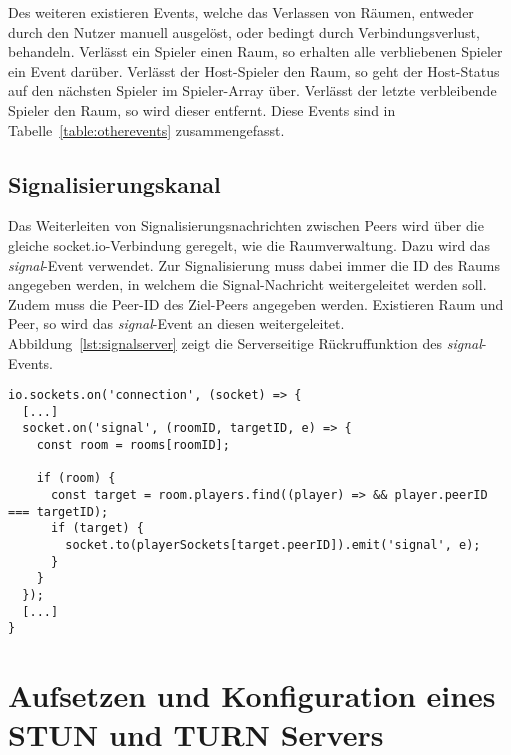 Des weiteren existieren Events, welche das Verlassen von Räumen, entweder durch den Nutzer manuell ausgelöst, oder bedingt durch Verbindungsverlust, behandeln. Verlässt ein Spieler einen Raum, so erhalten alle verbliebenen Spieler ein Event darüber. Verlässt der Host-Spieler den Raum, so geht der Host-Status auf den nächsten Spieler im Spieler-Array über. Verlässt der letzte verbleibende Spieler den Raum, so wird dieser entfernt. Diese Events sind in Tabelle~\ref{table:otherevents} zusammengefasst.\par

\subsection{Signalisierungskanal}
\label{section:signalisierungskanal}
Das Weiterleiten von Signalisierungsnachrichten zwischen Peers wird über die gleiche socket.io-Verbindung geregelt, wie die Raumverwaltung. Dazu wird das \textit{signal}-Event verwendet. Zur Signalisierung muss dabei immer die ID des Raums angegeben werden, in welchem die Signal-Nachricht weitergeleitet werden soll. Zudem muss die Peer-ID des Ziel-Peers angegeben werden. Existieren Raum und Peer, so wird das \textit{signal}-Event an diesen weitergeleitet. Abbildung~\ref{lst:signalserver} zeigt die Serverseitige Rückruffunktion des \textit{signal}-Events.

\vspace{11pt}
\lstset{language=js, style=STYLE_CODE_JS}
\begin{singlespace}
\begin{lstlisting}[caption={Event zum Weiterleiten eines Signals -- Server.js}, captionpos=b, label={lst:signalserver}]
io.sockets.on('connection', (socket) => {
  [...]
  socket.on('signal', (roomID, targetID, e) => {
    const room = rooms[roomID];

    if (room) {
      const target = room.players.find((player) => && player.peerID === targetID);
      if (target) {
        socket.to(playerSockets[target.peerID]).emit('signal', e);
      }
    }
  });
  [...]
}
\end{lstlisting}
\end{singlespace}

\section{Aufsetzen und Konfiguration eines STUN und TURN Servers}
